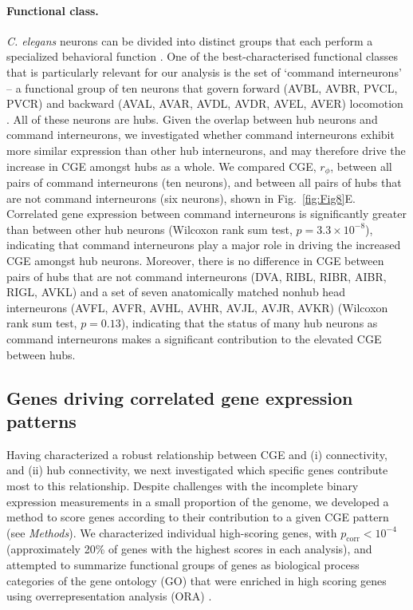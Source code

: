 \documentclass[10pt,letterpaper]{article}
\begin{document}
{\paragraph{Functional class.}
\emph{C. elegans} neurons can be divided into distinct groups that each perform a specialized behavioral function \cite{Hobert2003}.
One of the best-characterised functional classes that is particularly relevant for our analysis is the set of `command interneurons' -- a functional group of ten neurons that govern forward (AVBL, AVBR, PVCL, PVCR) and backward (AVAL, AVAR, AVDL, AVDR, AVEL, AVER) locomotion \cite{Rakowski2013}.
All of these neurons are hubs.
Given the overlap between hub neurons and command interneurons, we investigated whether command interneurons exhibit more similar expression than other hub interneurons, and may therefore drive the increase in CGE amongst hubs as a whole.
We compared CGE, $r_\phi$, between all pairs of command interneurons (ten neurons), and between all pairs of hubs that are not command interneurons (six neurons), shown in Fig.~\ref{fig:Fig8}E.
Correlated gene expression between command interneurons is significantly greater than between other hub neurons (Wilcoxon rank sum test, $p = 3.3 \times 10^{-8}$), indicating that command interneurons play a major role in driving the increased CGE amongst hub neurons.
Moreover, there is no difference in CGE between pairs of hubs that are not command interneurons (DVA, RIBL, RIBR, AIBR, RIGL, AVKL) and a set of seven anatomically matched nonhub head interneurons (AVFL, AVFR, AVHL, AVHR, AVJL, AVJR, AVKR) (Wilcoxon rank sum test, $p = 0.13$), indicating that the status of many hub neurons as command interneurons makes a significant contribution to the elevated CGE between hubs.

\subsection*{Genes driving correlated gene expression patterns}

Having characterized a robust relationship between CGE and (i) connectivity, and (ii) hub connectivity, we next investigated which specific genes contribute most to this relationship.
Despite challenges with the incomplete binary expression measurements in a small proportion of the genome, we developed a method to score genes according to their contribution to a given CGE pattern (see \emph{Methods}).
We characterized individual high-scoring genes, with $p_\mathrm{corr} < 10^{-4}$ (approximately 20\% of genes with the highest scores in each analysis), and attempted to summarize functional groups of genes as biological process categories of the gene ontology (GO) that were enriched in high scoring genes using overrepresentation analysis (ORA) \cite{Ashburner2000, Gillis2010}.

}
\end{document}
